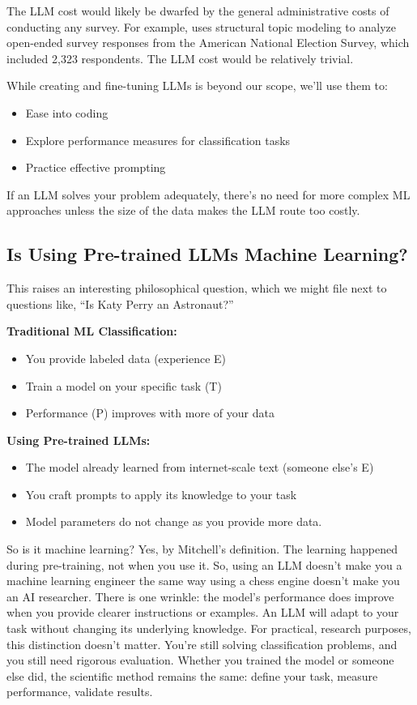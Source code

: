 The LLM cost would likely be dwarfed by the general administrative costs of conducting any survey. For example, \cite{roberts2014structural} uses structural topic modeling to analyze open-ended survey responses from the American National Election Survey, which included 2,323 respondents. The LLM cost would be relatively trivial.

While creating and fine-tuning LLMs is beyond our scope, we'll use them to:
\begin{itemize}
\item Ease into coding
\item Explore performance measures for classification tasks
\item Practice effective prompting
\end{itemize}

If an LLM solves your problem adequately, there's no need for more complex ML approaches unless the size of the data makes the LLM route too costly.

\subsection{Is Using Pre-trained LLMs Machine Learning?}

This raises an interesting philosophical question, which we might file next to questions like, ``Is Katy Perry an Astronaut?''

\textbf{Traditional ML Classification:}
\begin{itemize}
\item You provide labeled data (experience E)
\item Train a model on your specific task (T)
\item Performance (P) improves with more of your data
\end{itemize}

\textbf{Using Pre-trained LLMs:}
\begin{itemize}
\item The model already learned from internet-scale text (someone else's E)
\item You craft prompts to apply its knowledge to your task
\item Model parameters do not change as you provide more data.
\end{itemize}

So is it machine learning? Yes, by Mitchell's definition. The learning happened during pre-training, not when you use it. So, using an LLM doesn't make you a machine learning engineer the same way using a chess engine doesn't make you an AI researcher. There is one wrinkle: the model's performance does improve when you provide clearer instructions or examples. An LLM will adapt to your task without changing its underlying knowledge. For practical, research purposes, this distinction doesn't matter. You're still solving classification problems, and you still need rigorous evaluation. Whether you trained the model or someone else did, the scientific method remains the same: define your task, measure performance, validate results.

